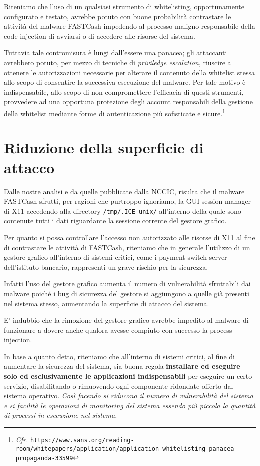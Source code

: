 \documentclass[10pt,a4paper, titlepage]{report}
\begin{document}
Riteniamo che l'uso di un qualsiasi strumento di whitelisting, opportunamente configurato e testato, avrebbe potuto con buone probabilità contrastare le attività del malware FASTCash impedendo al processo maligno responsabile della code injection di avviarsi o di accedere alle risorse del sistema.

Tuttavia tale contromisura è lungi dall'essere una panacea; gli attaccanti avrebbero potuto, per mezzo di tecniche di \textit{priviledge escalation}, riuscire a ottenere le autorizzazioni necessarie per alterare il contenuto della whitelist stessa allo scopo di consentire la successiva esecuzione del malware. Per tale motivo è indispensabile, allo scopo di non compromettere l'efficacia di questi strumenti, provvedere ad una opportuna protezione degli account responsabili della gestione della whitelist mediante forme di autenticazione più sofisticate e sicure.\footnote{\textit{Cfr.} \texttt{https://www.sans.org/reading-room/whitepapers/application/application-whitelisting-panacea-propaganda-33599}}

\section{Riduzione della superficie di attacco}

Dalle nostre analisi e da quelle pubblicate dalla NCCIC, risulta che il malware FASTCash sfrutti, per ragioni che purtroppo ignoriamo, la GUI session manager di X11 accedendo alla directory \texttt{/tmp/.ICE-unix/} all'interno della quale sono contenute tutti i dati riguardante la sessione corrente del gestore grafico.

Per quanto si possa controllare l'accesso non autorizzato alle risorse di X11 al fine di contrastare le attività di FASTCash, riteniamo che in generale l'utilizzo di un gestore grafico all'interno di sistemi critici, come i  payment switch server dell'istituto bancario, rappresenti un grave rischio per la sicurezza. 

Infatti l'uso del gestore grafico aumenta il numero di vulnerabilità sfruttabili dai malware poiché i bug di sicurezza del gestore si aggiungono a quelle già presenti nel sistema stesso, aumentando la superficie di attacco del sistema. 

E' indubbio che la rimozione del gestore grafico avrebbe impedito al malware di funzionare a dovere anche qualora avesse compiuto con successo la process injection.

In base a quanto detto, riteniamo che all'interno di sistemi critici, al fine di aumentare la sicurezza del sistema, sia buona regola \textbf{installare ed eseguire solo ed esclusivamente le applicazioni indispensabili} per eseguire un certo servizio, disabilitando o rimuovendo ogni componente ridondate offerto dal sistema operativo. \textit{Così facendo si riducono il numero di vulnerabilità del sistema e si facilità le operazioni di monitoring del sistema essendo più piccola la quantità di processi in esecuzione nel sistema.}
\end{document}
